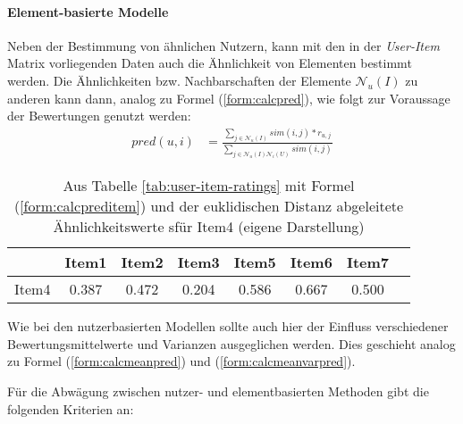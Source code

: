 \paragraph{Element-basierte Modelle} Neben der Bestimmung von ähnlichen Nutzern, kann mit den in der \textit{User-Item} Matrix vorliegenden Daten auch die Ähnlichkeit von Elementen bestimmt werden. Die Ähnlichkeiten bzw. Nachbarschaften der Elemente $\mathcal{N}_u(I)$ zu anderen kann dann, analog zu Formel (\ref{form:calcpred}), wie folgt zur Voraussage der Bewertungen genutzt werden:
\begin{align}
pred(u,i) & = \frac{ \sum_{j \in \mathcal{N}_u(I)} sim(i,j)*r_{u,j}}{ \sum_{j \in \mathcal{N}_u(I)\mathcal{N}_i(U)} sim(i,j) } \label{form:calcpreditem}
\end{align}

\begin{table}[ht]
  \centering
\begin{minipage}[b]{4in}
  \begin{tabular}{ | l || c | c | c | c | c | c | c | }
    \hline
           & Item1 & Item2 & Item3 & Item5 & Item6 & Item7 \\ \hline
Item4 &    0.387 &	0.472 &	0.204 & 0.586 & 0.667 & 0.500 \\
    \hline
  \end{tabular}
  \caption{\footnotesize Aus Tabelle \ref{tab:user-item-ratings} mit Formel (\ref{form:calcpreditem}) und der euklidischen Distanz abgeleitete Ähnlichkeitswerte sfür Item4 { \scriptsize (eigene Darstellung)}}
  \label{tab:item-item-sim}
\end{minipage}
\end{table}

Wie bei den nutzerbasierten Modellen sollte auch hier der Einfluss verschiedener Bewertungsmittelwerte und Varianzen ausgeglichen werden. Dies geschieht analog zu Formel (\ref{form:calcmeanpred}) und (\ref{form:calcmeanvarpred}).

Für die Abwägung zwischen nutzer- und elementbasierten Methoden gibt \citep{hb_04} die folgenden Kriterien an:

